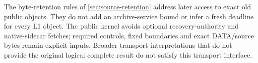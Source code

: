 The byte-retention rules of \cref{sec:source-retention} address later
access to exact old public objects. They do not add an archive-service
bound or infer a fresh deadline for every L1 object. The public kernel
avoids optional recovery-authority and native-sidecar fetches; required
controls, fixed boundaries and exact DATA/source bytes remain explicit
inputs. Broader transport interpretations that do not provide the
original logical complete result do not satisfy this transport interface.
